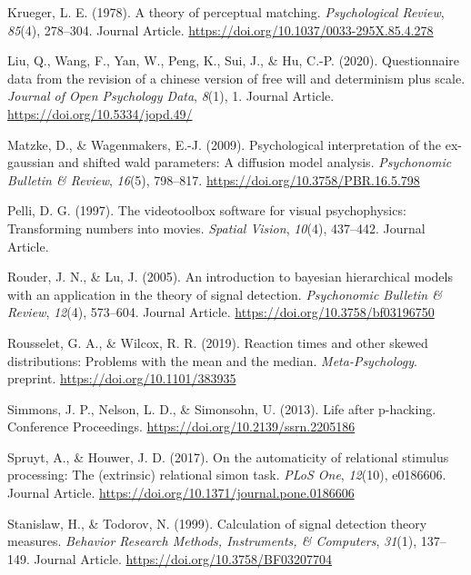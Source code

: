 \documentclass[
  english,
  man]{apa6}
\begin{document}
\leavevmode\hypertarget{ref-Krueger_1978}{}%
Krueger, L. E. (1978). A theory of perceptual matching. \emph{Psychological Review}, \emph{85}(4), 278--304. Journal Article. \url{https://doi.org/10.1037/0033-295X.85.4.278}

\leavevmode\hypertarget{ref-Liu_2020_JOPD}{}%
Liu, Q., Wang, F., Yan, W., Peng, K., Sui, J., \& Hu, C.-P. (2020). Questionnaire data from the revision of a chinese version of free will and determinism plus scale. \emph{Journal of Open Psychology Data}, \emph{8}(1), 1. Journal Article. \url{https://doi.org/10.5334/jopd.49/}

\leavevmode\hypertarget{ref-matzke_psychological_2009}{}%
Matzke, D., \& Wagenmakers, E.-J. (2009). Psychological interpretation of the ex-gaussian and shifted wald parameters: A diffusion model analysis. \emph{Psychonomic Bulletin \& Review}, \emph{16}(5), 798--817. \url{https://doi.org/10.3758/PBR.16.5.798}

\leavevmode\hypertarget{ref-Pelli_1997}{}%
Pelli, D. G. (1997). The videotoolbox software for visual psychophysics: Transforming numbers into movies. \emph{Spatial Vision}, \emph{10}(4), 437--442. Journal Article.

\leavevmode\hypertarget{ref-Rouder_2005_BHM_SDT}{}%
Rouder, J. N., \& Lu, J. (2005). An introduction to bayesian hierarchical models with an application in the theory of signal detection. \emph{Psychonomic Bulletin \& Review}, \emph{12}(4), 573--604. Journal Article. \url{https://doi.org/10.3758/bf03196750}

\leavevmode\hypertarget{ref-Rousselet_2019}{}%
Rousselet, G. A., \& Wilcox, R. R. (2019). Reaction times and other skewed distributions: Problems with the mean and the median. \emph{Meta-Psychology}. preprint. \url{https://doi.org/10.1101/383935}

\leavevmode\hypertarget{ref-Simmons_2013_life}{}%
Simmons, J. P., Nelson, L. D., \& Simonsohn, U. (2013). Life after p-hacking. Conference Proceedings. \url{https://doi.org/10.2139/ssrn.2205186}

\leavevmode\hypertarget{ref-Spruyt_de_Houwer_2017}{}%
Spruyt, A., \& Houwer, J. D. (2017). On the automaticity of relational stimulus processing: The (extrinsic) relational simon task. \emph{PLoS One}, \emph{12}(10), e0186606. Journal Article. \url{https://doi.org/10.1371/journal.pone.0186606}

\leavevmode\hypertarget{ref-Stanislaw_Todorov_1999}{}%
Stanislaw, H., \& Todorov, N. (1999). Calculation of signal detection theory measures. \emph{Behavior Research Methods, Instruments, \& Computers}, \emph{31}(1), 137--149. Journal Article. \url{https://doi.org/10.3758/BF03207704}
\end{document}
